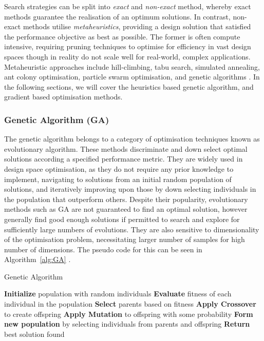\documentclass{article}
\begin{document}
Search strategies can be split into \textit{exact} and \textit{non-exact} method, whereby exact methods guarantee the realisation of an optimum solutions. In contrast, non-exact methods utilise \textit{metaheuristics}, providing a design solution that satisfied the performance objective as best as possible. The former is often compute intensive, requiring pruning techniques to optimise for efficiency in vast design spaces though in reality do not scale well for real-world, complex applications. Metaheuristic approaches include hill-climbing, tabu search, simulated annealing, ant colony optimisation, particle swarm optimisation, and genetic algorithms \citep{Panerati2016}. In the following sections, we will cover the heuristics based genetic algorithm, and gradient based optimisation methods.

\subsubsection{Genetic Algorithm (GA)}\label{GA}
The genetic algorithm belongs to a category of optimisation techniques known as evolutionary algorithm. These methods discriminate and down select optimal solutions according a specified performance metric. They are widely used in design space optimisation, as they do not require any prior knowledge to implement, navigating to solutions from an initial random population of solutions, and iteratively improving upon those \citep{Panerati2016} by down selecting individuals in the population that outperform others. Despite their popularity, evolutionary methods such as GA are not guaranteed to find an optimal solution, however generally find good enough solutions if permitted to search and explore for sufficiently large numbers of evolutions. They are also sensitive to dimensionality of the optimisation problem, necessitating larger number of samples for high number of dimensions. The pseudo code for this can be seen in Algorithm~\ref{alg:GA} \citep{Sivanandam2008}. 

\begin{algorithm}
\caption{Genetic Algorithm}
\begin{algorithmic}[1]
\label{alg:GA}
\STATE \textbf{Initialize} population with random individuals
    \STATE \textbf{Evaluate} fitness of each individual in the population
    \STATE \textbf{Select} parents based on fitness
    \STATE \textbf{Apply Crossover} to create offspring
    \STATE \textbf{Apply Mutation} to offspring with some probability
    \STATE \textbf{Form new population} by selecting individuals from parents and offspring
\ENDWHILE
\STATE \textbf{Return} best solution found
\end{algorithmic}
\end{algorithm}
\end{document}
